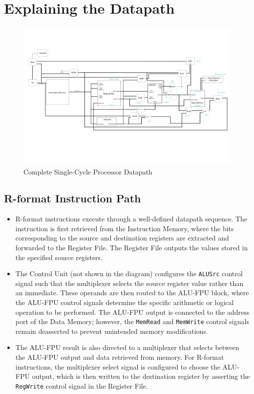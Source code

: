 \documentclass{article}
\begin{document}
\section*{Explaining the Datapath}

\begin{figure}[H]
    \centering
    \includegraphics[width=\linewidth]{datapath.png}
    \caption{Complete Single-Cycle Processor Datapath}
    \label{fig:datapath}
\end{figure}

\subsection*{R-format Instruction Path}

\begin{itemize}
    \item R-format instructions execute through a well-defined datapath sequence. The instruction is first retrieved from the Instruction Memory, where the bits corresponding to the source and destination registers are extracted and forwarded to the Register File. The Register File outputs the values stored in the specified source registers.

    \item The Control Unit (not shown in the diagram) configures the \texttt{ALUSrc} control signal such that the multiplexer selects the source register value rather than an immediate. These operands are then routed to the ALU-FPU block, where the ALU-FPU control signals determine the specific arithmetic or logical operation to be performed. The ALU-FPU output is connected to the address port of the Data Memory; however, the \texttt{MemRead} and \texttt{MemWrite} control signals remain deasserted to prevent unintended memory modifications.

    \item The ALU-FPU result is also directed to a multiplexer that selects between the ALU-FPU output and data retrieved from memory. For R-format instructions, the multiplexer select signal is configured to choose the ALU-FPU output, which is then written to the destination register by asserting the \texttt{RegWrite} control signal in the Register File.
\end{itemize}
\end{document}
